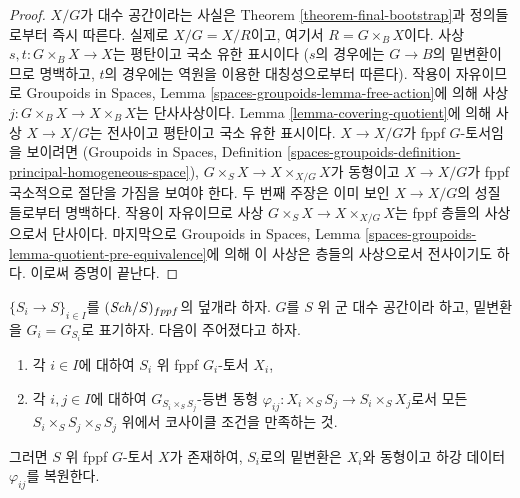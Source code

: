 \begin{proof}
$X/G$가 대수 공간이라는 사실은
Theorem \ref{theorem-final-bootstrap}과 정의들로부터 즉시 따른다.
실제로 $X/G = X/R$이고, 여기서 $R = G \times_B X$이다.
사상 $s, t : G \times_B X \to X$는 평탄이고 국소 유한 표시이다
($s$의 경우에는 $G \to B$의 밑변환이므로 명백하고,
$t$의 경우에는 역원을 이용한 대칭성으로부터 따른다).
작용이 자유이므로 Groupoids in Spaces, Lemma
\ref{spaces-groupoids-lemma-free-action}에 의해
사상 $j : G \times_B X \to X \times_B X$는 단사사상이다.
Lemma \ref{lemma-covering-quotient}에 의해 사상 $X \to X/G$는
전사이고 평탄이고 국소 유한 표시이다.
$X \to X/G$가 fppf $G$-토서임을 보이려면
(Groupoids in Spaces, Definition
\ref{spaces-groupoids-definition-principal-homogeneous-space}),
$G \times_S X \to X \times_{X/G} X$가 동형이고
$X \to X/G$가 fppf 국소적으로 절단을 가짐을 보여야 한다.
두 번째 주장은 이미 보인 $X \to X/G$의 성질들로부터 명백하다.
작용이 자유이므로 사상
$G \times_S X \to X \times_{X/G} X$는 fppf 층들의 사상으로서
단사이다. 마지막으로 Groupoids in Spaces, Lemma
\ref{spaces-groupoids-lemma-quotient-pre-equivalence}에 의해
이 사상은 층들의 사상으로서 전사이기도 하다.
이로써 증명이 끝난다.
\end{proof}

\begin{lemma}
\label{lemma-descent-torsor}
$\{S_i \to S\}_{i \in I}$를 $(\mathit{Sch}/S)_{fppf}$의 덮개라 하자.
$G$를 $S$ 위 군 대수 공간이라 하고,
밑변환을 $G_i = G_{S_i}$로 표기하자.
다음이 주어졌다고 하자.
\begin{enumerate}
\item 각 $i \in I$에 대하여 $S_i$ 위 fppf $G_i$-토서 $X_i$,
\item 각 $i, j \in I$에 대하여
$G_{S_i \times_S S_j}$-등변 동형
$\varphi_{ij} : X_i \times_S S_j \to S_i \times_S X_j$로서 모든
$S_i \times_S S_j \times_S S_j$ 위에서 코사이클 조건을 만족하는 것.
\end{enumerate}
그러면 $S$ 위 fppf $G$-토서 $X$가 존재하여,
$S_i$로의 밑변환은 $X_i$와 동형이고 하강 데이터
$\varphi_{ij}$를 복원한다.
\end{lemma}

